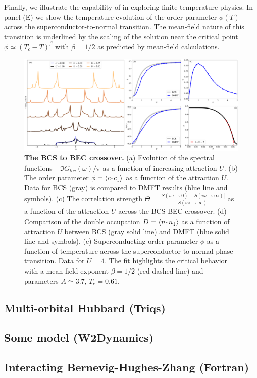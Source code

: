 \documentclass[edipack2.tex]{subfiles}
\begin{document}
Finally, we illustrate the capability of \NAME in
exploring finite temperature physics. In panel (E) we show the
temperature evolution of the order parameter $\phi(T)$ across the
superconductor-to-normal transition. The mean-field nature of this
transition is underlined by the scaling of  the solution near
the critical point $\phi \simeq (T_c-T)^\beta$ with $\beta=1/2$ as
predicted by mean-field calculations. 

\begin{figure}[t!]
  \includegraphics[width=\linewidth]{figures/figAHM.pdf}
    \caption{\label{figEx2}%
      \textbf{The BCS to BEC crossover.}
      (a) Evolution of the spectral functions
      $-\Im{G_{loc}(\omega)}/\pi$ as a function of increasing
      attraction $U$. 
      (b) The order parameter $\phi=\langle c_\uparrow c_\downarrow\rangle$ as a
      function of the attraction $U$. Data for BCS (gray) is compared
      to DMFT results (blue line and symbols). 
      (c) The correlation strength
      $\Theta=\frac{|S(i\omega\to0)-S(i\omega\to\infty)|}{S(i\omega\to\infty)}$ as a function of the
      attraction $U$ across the BCS-BEC crossover. 
      (d) Comparison of the double occupation $D=\langle n_\uparrow
      n_\downarrow\rangle$ as a function of attraction $U$ between BCS (gray
      solid line) and DMFT (blue solid line and symbols). 
      (e) Superconducting order
      parameter $\phi$ as a function of temperature across the
      superconductor-to-normal phase transition. Data for $U=4$. The
      fit highlights the critical behavior with a mean-field exponent
      $\beta=1/2$ (red dashed line) and parameters $A\simeq 3.7$, $T_c=0.61$.       
        }
\end{figure}





\subsection{Multi-orbital Hubbard (Triqs)}

\subsection{Some model (W2Dynamics)}

\subsection{Interacting Bernevig-Hughes-Zhang (Fortran)}
\end{document}
